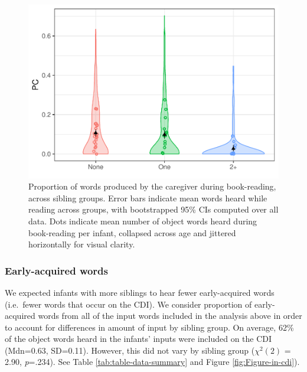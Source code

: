 \documentclass[
  english,
  man,floatsintext]{apa6}
\begin{document}
\begin{figure}
\centering
\includegraphics{SiblingsStudyText_files/figure-latex/Figure-reading-1.pdf}
\caption{\label{fig:Figure-reading}Proportion of words produced by the caregiver during book-reading, across sibling groups. Error bars indicate mean words heard while reading across groups, with bootstrapped 95\% CIs computed over all data. Dots indicate mean number of object words heard during book-reading per infant, collapsed across age and jittered horizontally for visual clarity.}
\end{figure}

\hypertarget{early-acquired-words}{%
\subsubsection{Early-acquired words}\label{early-acquired-words}}

We expected infants with more siblings to hear fewer early-acquired words (i.e.~fewer words that occur on the CDI). We consider proportion of early-acquired words from all of the input words included in the analysis above in order to account for differences in amount of input by sibling group. On average, 62\% of the object words heard in the infants' inputs were included on the CDI (Mdn=0.63, SD=0.11). However, this did not vary by sibling group (\(\chi^2 (2)\) = 2.90, \emph{p}=.234). See Table \ref{tab:table-data-summary} and Figure \ref{fig:Figure-in-cdi}).
\end{document}
